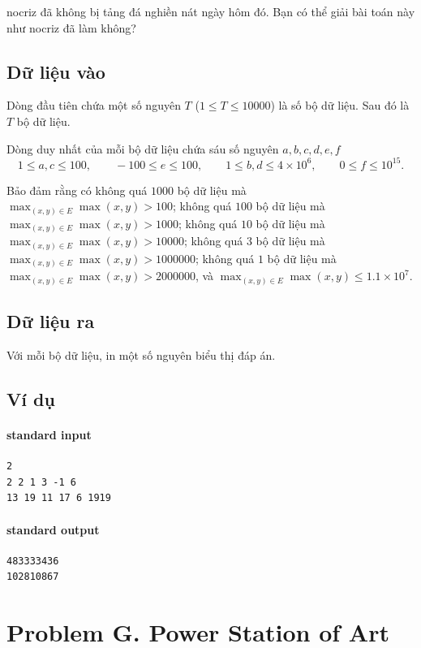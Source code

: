 \documentclass[11pt]{article}
\begin{document}
nocriz đã không bị tảng đá nghiền nát ngày hôm đó. Bạn có thể giải bài toán
này như nocriz đã làm không?

\subsection*{Dữ liệu vào}

Dòng đầu tiên chứa một số nguyên \(T\) (\(1\le T\le 10000\)) là số bộ dữ
liệu. Sau đó là \(T\) bộ dữ liệu.

Dòng duy nhất của mỗi bộ dữ liệu chứa sáu số nguyên \(a,b,c,d,e,f\)
\[
  1\le a,c\le 100,\qquad -100\le e\le 100,\qquad
  1\le b,d\le 4\times 10^6,\qquad 0\le f\le 10^{15}.
\]

Bảo đảm rằng có không quá \(1000\) bộ dữ liệu mà
\(\max_{(x,y)\in E}\max(x,y)>100\); không quá \(100\) bộ dữ liệu mà
\(\max_{(x,y)\in E}\max(x,y)>1000\); không quá \(10\) bộ dữ liệu mà
\(\max_{(x,y)\in E}\max(x,y)>10000\); không quá \(3\) bộ dữ liệu mà
\(\max_{(x,y)\in E}\max(x,y)>1000000\); không quá \(1\) bộ dữ liệu mà
\(\max_{(x,y)\in E}\max(x,y)>2000000\), và
\(\max_{(x,y)\in E}\max(x,y)\le 1.1\times 10^7\).

\subsection*{Dữ liệu ra}

Với mỗi bộ dữ liệu, in một số nguyên biểu thị đáp án.

\subsection*{Ví dụ}

\paragraph{standard input}
\begin{verbatim}
2
2 2 1 3 -1 6
13 19 11 17 6 1919
\end{verbatim}

\paragraph{standard output}
\begin{verbatim}
483333436
102810867
\end{verbatim}

\section{Problem G. Power Station of Art}
\end{document}
